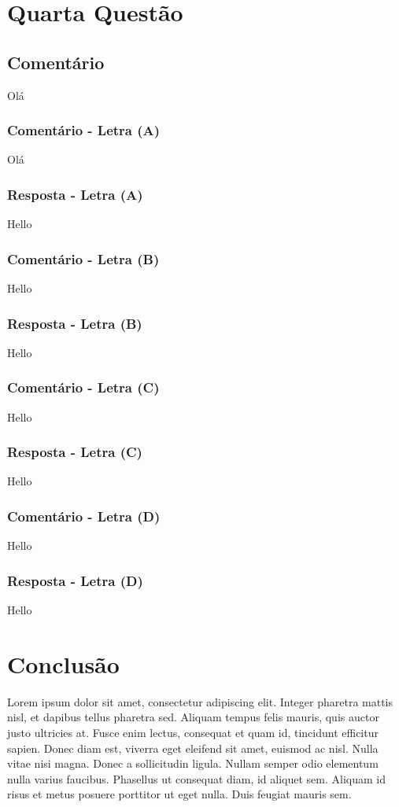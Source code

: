 \documentclass[12pt, a4paper]{article}
\begin{document}
\section{Quarta Questão}
	\subsection{Comentário}
		Olá
		\subsubsection{Comentário - Letra (A)}
			Olá
		\subsubsection{Resposta - Letra (A)}
			Hello
		\subsubsection{Comentário - Letra (B)}
			Hello
		\subsubsection{Resposta - Letra (B)}
			Hello
		\subsubsection{Comentário - Letra (C)}
			Hello	
		\subsubsection{Resposta - Letra (C)}
			Hello
		\subsubsection{Comentário - Letra (D)}
			Hello	
		\subsubsection{Resposta - Letra (D)}
			Hello

\section{Conclusão}
Lorem ipsum dolor sit amet, consectetur adipiscing elit. Integer pharetra mattis nisl, et dapibus tellus pharetra sed. Aliquam tempus felis mauris, quis auctor justo ultricies at. Fusce enim lectus, consequat et quam id, tincidunt efficitur sapien. Donec diam est, viverra eget eleifend sit amet, euismod ac nisl. Nulla vitae nisi magna. Donec a sollicitudin ligula. Nullam semper odio elementum nulla varius faucibus. Phasellus ut consequat diam, id aliquet sem. Aliquam id risus et metus posuere porttitor ut eget nulla. Duis feugiat mauris sem.
\end{document}
